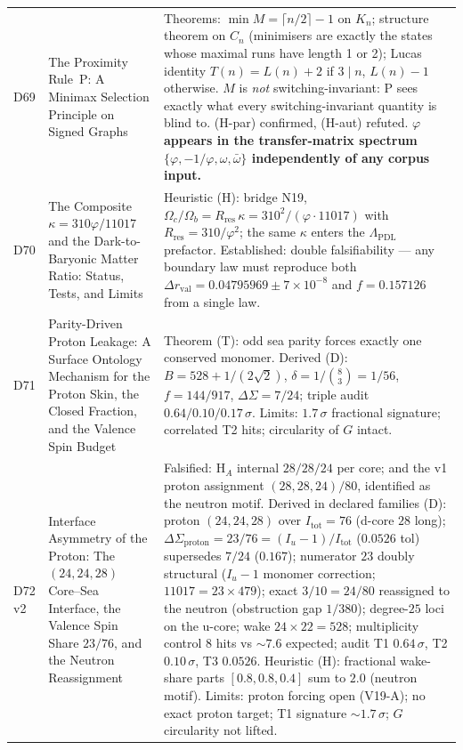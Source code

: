 \documentclass[11pt,a4paper]{article}
\theoremstyle{plain}
\theoremstyle{definition}
\theoremstyle{remark}
\begin{document}
\begin{longtable}{L{1.3cm}L{3.8cm}L{8.0cm}}
D69 & The Proximity Rule~P: A Minimax Selection Principle on Signed Graphs~\cite{D69} & \textcolor{proofblue}{Theorems}: $\min M=\lceil n/2\rceil-1$ on $K_n$; structure theorem on $C_n$ (minimisers are exactly the states whose maximal runs have length 1 or 2); Lucas identity $T(n)=L(n)+2$ if $3\mid n$, $L(n)-1$ otherwise. $M$ is \emph{not} switching-invariant: P sees exactly what every switching-invariant quantity is blind to. (H-par) confirmed, (H-aut) refuted. \textbf{$\varphi$ appears in the transfer-matrix spectrum $\{\varphi,-1/\varphi,\omega,\bar\omega\}$ independently of any corpus input.}\\[0.3em]
D70 & The Composite $\kappa=310\varphi/11017$ and the Dark-to-Baryonic Matter Ratio: Status, Tests, and Limits~\cite{D70} & \textcolor{hypothesisorange}{Heuristic (H)}: bridge N19, $\Omega_{c}/\Omega_{b}=R_{\mathrm{res}}\,\kappa=310^{2}/(\varphi\cdot11017)$ with $R_{\mathrm{res}}=310/\varphi^{2}$; the same $\kappa$ enters the $\Lambda_{\mathrm{PDL}}$ prefactor. \textcolor{proofblue}{Established}: double falsifiability --- any boundary law must reproduce both $\Delta r_{\mathrm{val}}=0.04795969\pm7\times10^{-8}$ and $f=0.157126$ from a single law.\\[0.3em]
D71 & Parity-Driven Proton Leakage: A Surface Ontology Mechanism for the Proton Skin, the Closed Fraction, and the Valence Spin Budget~\cite{D71} & \textcolor{proofblue}{Theorem (T)}: odd sea parity forces exactly one conserved monomer. \textcolor{proofblue}{Derived (D)}: $B=528+1/(2\sqrt{2})$, $\delta=1/\binom{8}{3}=1/56$, $f=144/917$, $\Delta\Sigma=7/24$; triple audit $0.64/0.10/0.17\,\sigma$. \textcolor{negativered}{Limits}: $1.7\,\sigma$ fractional signature; correlated T2 hits; circularity of $G$ intact.\\[0.3em]
D72 v2 & Interface Asymmetry of the Proton: The $(24,24,28)$ Core--Sea Interface, the Valence Spin Share $23/76$, and the Neutron Reassignment~\cite{D72} & \textcolor{negativered}{Falsified}: H$_{A}$ internal $28/28/24$ per core; and the v1 proton assignment $(28,28,24)/80$, identified as the neutron motif. \textcolor{proofblue}{Derived in declared families (D)}: proton $(24,24,28)$ over $I_{\mathrm{tot}}=76$ (d-core $28$ long); $\Delta\Sigma_{\mathrm{proton}}=23/76=(I_u-1)/I_{\mathrm{tot}}$ ($0.0526$ tol) supersedes $7/24$ ($0.167$); numerator $23$ doubly structural ($I_u-1$ monomer correction; $11017=23\times479$); exact $3/10=24/80$ reassigned to the neutron (obstruction gap $1/380$); degree-$25$ loci on the u-core; wake $24\times22=528$; multiplicity control $8$ hits vs $\sim7.6$ expected; audit T1 $0.64\,\sigma$, T2 $0.10\,\sigma$, T3 $0.0526$. \textcolor{hypothesisorange}{Heuristic (H)}: fractional wake-share parts $[0.8,0.8,0.4]$ sum to $2.0$ (neutron motif). \textcolor{negativered}{Limits}: proton forcing open (V19-A); no exact proton target; T1 signature $\sim1.7\,\sigma$; $G$ circularity not lifted.\\[0.3em]
\end{longtable}
\end{document}
